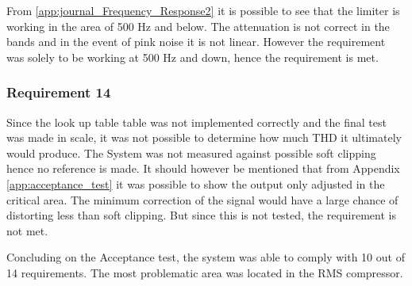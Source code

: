 From \autoref{app:journal_Frequency_Response2} it is possible to see that the limiter is working in the area of 500 Hz and below. The attenuation is not correct in the bands and in the event of pink noise it is not linear. However the requirement was solely to be working at 500 Hz and down, hence the requirement is met.
\vspace*{-5mm}
\subsubsection*{Requirement 14}

Since the look up table table was not implemented correctly and the final test was made in scale, it was not possible to determine how much THD it ultimately would produce. The System was not measured against possible soft clipping hence no reference is made. It should however be mentioned that from Appendix \ref{app:acceptance_test} it was possible to show the output only adjusted in the critical area. The minimum correction of the signal would have a large chance of distorting less than soft clipping. But since this is not tested, the requirement is not met.

Concluding on the Acceptance test, the system was able to comply with 10 out of 14 requirements. The most problematic area was located in the RMS compressor. 












